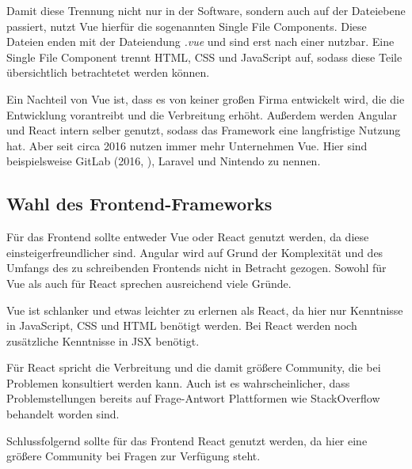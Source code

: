 Damit diese Trennung nicht nur in der Software, sondern auch auf der Dateiebene passiert, nutzt Vue hierfür die sogenannten Single File Components. Diese Dateien enden mit der Dateiendung \textit{.vue} und sind erst nach einer  nutzbar. Eine Single File Component trennt HTML, CSS und JavaScript auf, sodass diese Teile übersichtlich betrachtetet werden können. \cite{teufelVueJsTutorial2018a}

Ein Nachteil von Vue ist, dass es von keiner großen Firma entwickelt wird, die die Entwicklung vorantreibt und die Verbreitung erhöht. Außerdem werden Angular und React intern selber genutzt, sodass das Framework eine langfristige Nutzung hat. Aber seit circa 2016 nutzen immer mehr Unternehmen Vue. Hier sind beispielsweise GitLab (2016, \cite{schatzWhyWeChose2016}), Laravel und Nintendo zu nennen. \cite{techuzTopWebsitesBuilt2018}

\subsection{Wahl des Frontend-Frameworks}

Für das Frontend sollte entweder Vue oder React genutzt werden, da diese einsteigerfreundlicher sind. Angular wird auf Grund der Komplexität und des Umfangs des zu schreibenden Frontends nicht in Betracht gezogen. Sowohl für Vue als auch für React sprechen ausreichend viele Gründe.

Vue ist schlanker und etwas leichter zu erlernen als React, da hier nur Kenntnisse in \linebreak JavaScript, CSS und HTML benötigt werden. Bei React werden noch zusätzliche Kenntnisse in JSX benötigt.

Für React spricht die Verbreitung und die damit größere Community, die bei Problemen konsultiert werden kann. Auch ist es wahrscheinlicher, dass Problemstellungen bereits auf Frage-Antwort Plattformen wie StackOverflow behandelt worden sind. 

Schlussfolgernd sollte für das Frontend React genutzt werden, da hier eine größere Community bei Fragen zur Verfügung steht.
